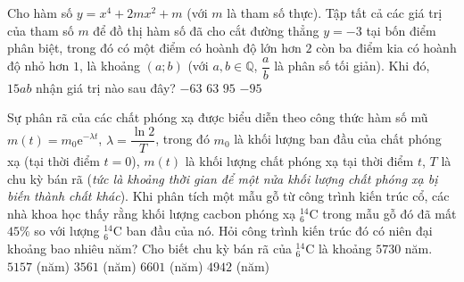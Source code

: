 \begin{ex}%
Cho hàm số $y=x^4 +2mx^2 +m$ (với $m$ là tham số thực). Tập tất cả các giá trị của tham số $m$ để đồ thị hàm số đã cho cắt đường thẳng $y=-3$ tại bốn điểm phân biệt, trong đó có một điểm có hoành độ lớn hơn $2$ còn ba điểm kia có hoành độ nhỏ hơn $1$, là khoảng $(a;b)$ (với $a,b \in \mathbb{Q}$, $\dfrac{a}{b}$ là phân số tối giản). Khi đó, $15ab$ nhận giá trị nào sau đây?
\choice
{$-63$}
{$63$}
{\True $95$}
{$-95$}
\end{ex}

\begin{ex}%
Sự phân rã của các chất phóng xạ được biểu diễn theo công thức hàm số mũ $m(t) = m_0 \mathrm{e}^{-\lambda t}$, $\lambda = \dfrac{\ln 2}{T}$, trong đó $m_0$ là khối lượng ban đầu của chất phóng xạ (tại thời điểm $t=0$), $m(t)$ là khối lượng chất phóng xạ tại thời điểm $t$, $T$ là chu kỳ bán rã (\textit{tức là khoảng thời gian để một nửa khối lượng chất phóng xạ bị biến thành chất khác}). Khi phân tích một mẫu gỗ từ công trình kiến trúc cổ, các nhà khoa học thấy rằng khối lượng cacbon phóng xạ $^{14}_6 \mathrm{C}$ trong mẫu gỗ đó đã mất $45\%$ so với lượng $^{14}_6 \mathrm{C}$ ban đầu của nó. Hỏi công trình kiến trúc đó có niên đại khoảng bao nhiêu năm? Cho biết chu kỳ bán rã của $^{14}_6 \mathrm{C}$ là khoảng $5730$ năm.
\choice
{$5157$ (năm)}
{$3561$ (năm)}
{$6601$ (năm)}
{\True $4942$ (năm)}
\end{ex}

